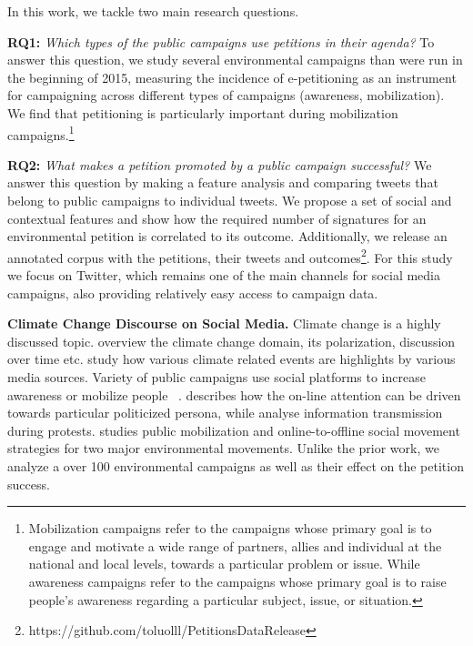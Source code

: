 In this work, we tackle two main research questions.

\textbf{RQ1:} \textit{Which types of the public campaigns use petitions in their agenda?}
To answer this question, we study several environmental campaigns than were run in the beginning of 2015, measuring the incidence of e-petitioning as an instrument for campaigning across different types of campaigns (awareness, mobilization). We find that petitioning is particularly important during mobilization campaigns.\footnote{Mobilization campaigns refer to the campaigns whose primary goal is to engage and motivate a wide range of partners, allies and individual at the national and local levels, towards a particular problem or issue. While awareness campaigns refer to the campaigns whose primary goal is to raise people’s awareness regarding a particular subject, issue, or situation.}

\textbf{RQ2:} \textit{What makes a petition promoted by a public campaign successful?} We answer this question by making a feature analysis and comparing tweets that belong to public campaigns to individual tweets. 
%
We propose a set of social and contextual features and show how the required number of signatures for an environmental petition is  correlated to its outcome.
Additionally, we release an annotated corpus with the petitions, their tweets and outcomes\footnote{https://github.com/toluolll/PetitionsDataRelease}.
For this study we focus on Twitter, which remains one of the main channels for social media campaigns, also providing relatively easy access to campaign data.

\textbf{Climate Change Discourse on Social Media.} Climate change is a highly discussed topic. \citeauthor{Kirilenko2014}  overview the climate change domain, its polarization, discussion over time etc. \citeauthor{Olteanu2015}  study how various climate related events are highlights by various media sources.
Variety of public campaigns use social platforms to increase awareness or mobilize people~\citeauthor{Mahmud2014} .
\citeauthor{Tufekci2013}  describes how the on-line attention can be driven towards particular politicized persona, while \citeauthor{gonzalez2013networked}  analyse information transmission during protests.
\citeauthor{hestres2013preaching}  studies public mobilization and online-to-offline social movement strategies for two major environmental movements. Unlike the prior work, we analyze a over 100 environmental campaigns as well as their effect on the petition success.

